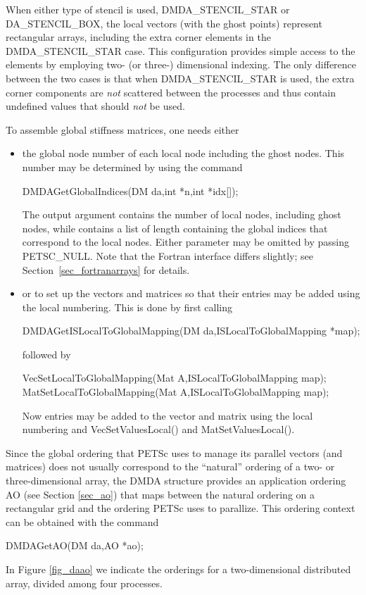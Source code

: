 When either type of stencil is used, DMDA\_STENCIL\_STAR or 
DA\_STENCIL\_BOX, the local vectors (with the ghost points) 
represent rectangular arrays, including the extra corner elements in 
the DMDA\_STENCIL\_STAR case. This configuration provides simple 
access to the elements by employing two- (or three-) dimensional indexing. 
The only difference between the 
two cases is that when DMDA\_STENCIL\_STAR is used, the extra 
corner components are {\em not} scattered between the processes and thus
contain undefined values that should {\em not} be used.

To assemble global stiffness matrices, one needs either 
\begin{itemize}
\item
the global node number of each local node 
including the ghost nodes. This number may be determined by using the 
command 
\begin{tabbing}
  DMDAGetGlobalIndices(DM da,int *n,int *idx[]);
\end{tabbing}
The output argument  contains the number of 
local nodes, including ghost nodes, while  contains a list of length
 containing the global indices that correspond to the local nodes. Either
parameter may be omitted by passing PETSC_NULL. Note that the Fortran
interface differs slightly; see Section~\ref{sec_fortranarrays} for details.
\item
or to set up the vectors and matrices so that their entries may be
added using the local numbering. This is done by first calling 
\begin{tabbing}
  DMDAGetISLocalToGlobalMapping(DM da,ISLocalToGlobalMapping *map);
\end{tabbing}
followed by 
\begin{tabbing}
  VecSetLocalToGlobalMapping(Mat A,ISLocalToGlobalMapping map);\\
  MatSetLocalToGlobalMapping(Mat A,ISLocalToGlobalMapping map);
\end{tabbing}
Now entries may be added to the vector and matrix using the local numbering
and VecSetValuesLocal() and MatSetValuesLocal().
\end{itemize}

Since the global ordering that PETSc uses to manage its parallel vectors 
(and matrices) does not usually correspond to the ``natural'' ordering 
of a two- or three-dimensional array, the DMDA structure provides 
an application ordering AO (see Section \ref{sec_ao}) that maps 
between the natural ordering on a rectangular grid and the ordering PETSc
uses to parallize. This ordering context can be obtained with the command
\begin{tabbing}
  DMDAGetAO(DM da,AO *ao);
\end{tabbing}
In Figure \ref{fig_daao} we indicate the orderings for a two-dimensional distributed 
array, divided among four processes.


